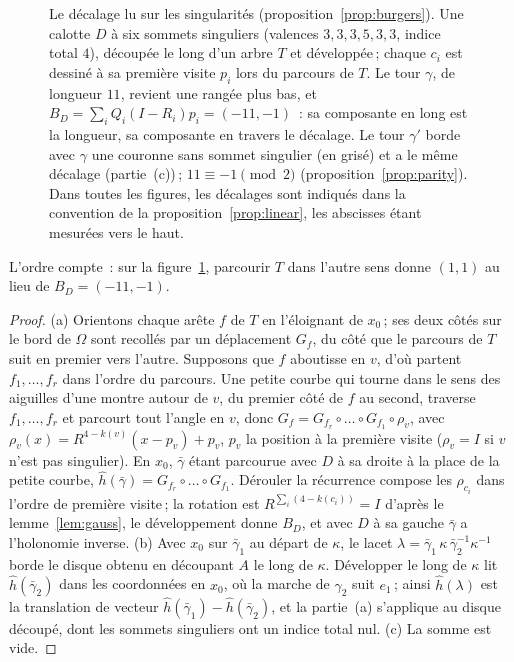 \documentclass[11pt,a4paper]{article}
\begin{document}
\begin{figure}[t]
\centering

\caption{Le décalage lu sur les singularités
(proposition~\ref{prop:burgers}). Une calotte $D$ à six sommets singuliers
(valences $3, 3, 3, 5, 3, 3$, indice total $4$), découpée le long d'un arbre
$T$ et développée\,; chaque $c_i$ est dessiné à sa première visite $p_i$ lors
du parcours de $T$. Le tour $\gamma$, de longueur $11$, revient une rangée
plus bas, et $B_D = \sum_i Q_i (I - R_i) p_i = (-11, -1)$~: sa composante en
long est la longueur, sa composante en travers le décalage. Le tour $\gamma'$
borde avec $\gamma$ une couronne sans sommet singulier (en grisé) et a le même
décalage (partie~(c))\,; $11 \equiv -1 \pmod 2$
(proposition~\ref{prop:parity}). Dans toutes les figures, les décalages sont
indiqués dans la convention de la proposition~\ref{prop:linear}, les abscisses
étant mesurées vers le haut.}
\label{fig:holonomy}
\end{figure}

L'ordre compte~: sur la figure~\ref{fig:holonomy}, parcourir $T$ dans l'autre
sens donne $(1, 1)$ au lieu de $B_D = (-11, -1)$.

\begin{proof}
(a) Orientons chaque arête $f$ de $T$ en l'éloignant de $x_0$\,; ses deux
côtés sur le bord de $\Omega$ sont recollés par un déplacement $G_f$, du côté
que le parcours de $T$ suit en premier vers l'autre. Supposons que $f$
aboutisse en $v$, d'où partent $f_1, \dots, f_r$ dans l'ordre du parcours. Une
petite courbe qui tourne dans le sens des aiguilles d'une montre autour de
$v$, du premier côté de $f$ au second, traverse $f_1, \dots, f_r$ et parcourt
tout l'angle en $v$, donc $G_f = G_{f_r} \circ \dots \circ G_{f_1} \circ
\rho_v$, avec $\rho_v(x) = R^{4-k(v)}(x - p_v) + p_v$, $p_v$ la position à la
première visite ($\rho_v = I$ si $v$ n'est pas singulier). En $x_0$,
$\bar\gamma$ étant parcourue avec $D$ à sa droite à la place de la petite
courbe, $\hat h(\bar\gamma) = G_{f_r} \circ \dots \circ G_{f_1}$. Dérouler la
récurrence compose les $\rho_{c_i}$ dans l'ordre de première visite\,; la
rotation est $R^{\sum_i(4 - k(c_i))} = I$ d'après le lemme~\ref{lem:gauss},
le développement donne $B_D$, et avec $D$ à sa gauche $\bar\gamma$ a
l'holonomie inverse. (b) Avec $x_0$ sur $\bar\gamma_1$ au départ de $\kappa$,
le lacet $\lambda = \bar\gamma_1\, \kappa\, \bar\gamma_2^{-1} \kappa^{-1}$
borde le disque obtenu en découpant $A$ le long de $\kappa$. Développer le
long de $\kappa$ lit $\hat h(\bar\gamma_2)$ dans les coordonnées en $x_0$, où
la marche de $\gamma_2$ suit $e_1$\,; ainsi $\hat h(\lambda)$ est la
translation de vecteur $\hat h(\bar\gamma_1) - \hat h(\bar\gamma_2)$, et la
partie~(a) s'applique au disque découpé, dont les sommets singuliers ont un
indice total nul. (c) La somme est vide.
\end{proof}
\end{document}
